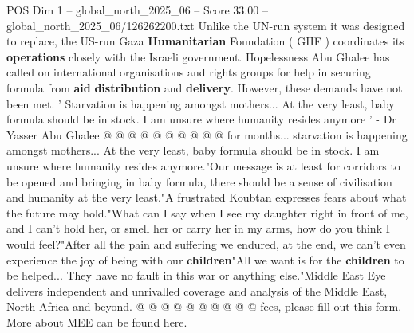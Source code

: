 \begin{textsample}{POS Dim 1 – global\_north\_2025\_06 – Score 33.00 – global\_north\_2025\_06/126262200.txt}
Unlike the UN-run system it was designed to replace, the US-run Gaza \textbf{Humanitarian} Foundation ( GHF ) coordinates its \textbf{operations} closely with the Israeli government.
Hopelessness Abu Ghalee has called on international organisations and rights groups for help in securing formula from \textbf{aid} \textbf{distribution} and \textbf{delivery}.
However, these demands have not been met. ' Starvation is happening amongst mothers...
At the very least, baby formula should be in stock.
I am unsure where humanity resides anymore ' - Dr Yasser Abu Ghalee @ @ @ @ @ @ @ @ @ @ for months... starvation is happening amongst mothers...
At the very least, baby formula should be in stock.
I am unsure where humanity resides anymore."Our message is at least for corridors to be opened and bringing in baby formula, there should be a sense of civilisation and humanity at the very least."A frustrated Koubtan expresses fears about what the future may hold."What can I say when I see my daughter right in front of me, and I can't hold her, or smell her or carry her in my arms, how do you think I would feel?"After all the pain and suffering we endured, at the end, we can't even experience the joy of being with our \textbf{children}"All we want is for the \textbf{children} to be helped...
They have no fault in this war or anything else."Middle East Eye delivers independent and unrivalled coverage and analysis of the Middle East, North Africa and beyond. @ @ @ @ @ @ @ @ @ @ fees, please fill out this form.
More about MEE can be found here.

\end{textsample}
